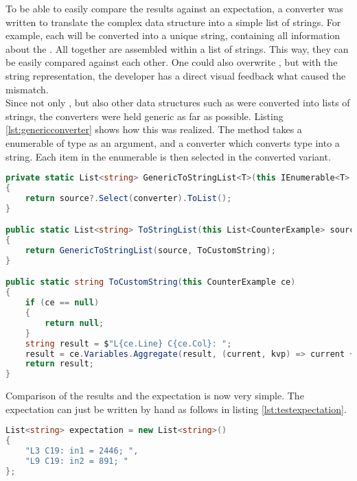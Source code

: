 To be able to easily compare the results against an expectation,
a converter was written to translate the complex data structure into a simple list of strings.
For example, each  will be converted into a unique string, containing all information about the .
All  together are assembled within a list of strings.
This way, they can be easily compared against each other.
One could also overwrite , but with the string representation, the developer has a direct visual feedback what caused the mismatch.\\

Since not only , but also other data structures such as  were converted into lists of strings,
the converters were held generic as far as possible.
Listing \ref{lst:genericconverter} shows how this was realized.
The method takes a enumerable of type  as an argument, and a converter which converts type  into a string.
Each item in the enumerable is then selected in the converted variant.

\begin{lstlisting}[language=csharp, caption={Converting CounterExamples to a List of Strings}, captionpos=b, label={lst:genericconverter}]
private static List<string> GenericToStringList<T>(this IEnumerable<T> source, Func<T, string> converter)
{
    return source?.Select(converter).ToList();
}

public static List<string> ToStringList(this List<CounterExample> source)
{
    return GenericToStringList(source, ToCustomString);
}

public static string ToCustomString(this CounterExample ce)
{
    if (ce == null)
    {
        return null;
    }
    string result = $"L{ce.Line} C{ce.Col}: ";
    result = ce.Variables.Aggregate(result, (current, kvp) => current + $"{kvp.Key} = {kvp.Value}; ");
    return result;
}
\end{lstlisting}

Comparison of the results and the expectation is now very simple.
The expectation can just be written by hand as follows in listing \ref{lst:testexpectation}.

\begin{lstlisting}[language=csharp, caption={Expectation}, captionpos=b, label={lst:testexpectation}]
List<string> expectation = new List<string>()
{
    "L3 C19: in1 = 2446; ",
    "L9 C19: in2 = 891; "
};
\end{lstlisting}

